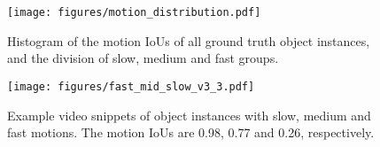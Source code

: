 \documentclass[10pt,twocolumn,letterpaper]{article}
\begin{document}
\begin{figure}
\begin{center}
\texttt{[image: figures/motion\_distribution.pdf]}
\end{center}
\caption{Histogram of the motion IoUs of all ground truth object instances, and the division of slow, medium and fast groups.}
\label{fig.motion_distribution}
\end{figure}

\begin{figure}
\begin{center}
\texttt{[image: figures/fast\_mid\_slow\_v3\_3.pdf]}
\end{center}
\caption{Example video snippets of object instances with slow, medium and fast motions. The motion IoUs are 0.98, 0.77 and 0.26, respectively.}
\label{fig.fast_mid_slow}\vspace{-0.5em}
\end{figure}
\end{document}
